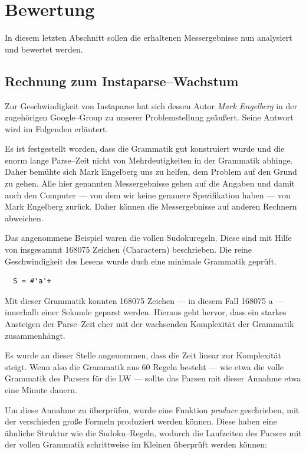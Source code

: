 \documentclass[ngerman,a4paper,abstracton,open=right,twoside=false,toc=listofnumbered,bibtotocnumbered]{scrreprt}
\begin{document}
\chapter{Bewertung}

In diesem letzten Abschnitt sollen die erhaltenen Messergebnisse nun analysiert und bewertet werden.


\section{Rechnung zum Instaparse--Wachstum}

Zur Geschwindigkeit von Instaparse hat sich dessen Autor \emph{Mark Engelberg} in der zugehörigen Google--Group zu unserer Problemstellung geäußert. Seine Antwort wird im Folgenden erläutert. \cite{instaparse-google-group}

Es ist festgestellt worden, dass die Grammatik gut konstruiert wurde und die enorm lange Parse--Zeit nicht von Mehrdeutigkeiten in der Grammatik abhinge. Daher bemühte sich Mark Engelberg uns zu helfen, dem Problem auf den Grund zu gehen. Alle hier genannten Messergebnisse gehen auf die Angaben und damit auch den Computer --- von dem wir keine genauere Spezifikation haben --- von Mark Engelberg zurück. Daher können die Messergebnisse auf anderen Rechnern abweichen.

Das angenommene Beispiel waren die vollen Sudokuregeln. Diese sind mit Hilfe von insgesammt 168075 Zeichen (Charactern) beschrieben. Die reine Geschwindigkeit des Lesens wurde duch eine minimale Grammatik geprüft.

\begin{lstlisting}
  S = #'a'+
\end{lstlisting}

Mit dieser Grammatik konnten 168075 Zeichen --- in diesem Fall 168075 \glqq{}a\grqq{} --- innerhalb einer Sekunde geparst werden. Hieraus geht hervor, dass ein starkes Ansteigen der Parse--Zeit eher mit der wachsenden Komplexität der Grammatik zusammenhängt.

Es wurde an dieser Stelle angenommen, dass die Zeit linear zur Komplexität steigt. Wenn also die Grammatik aus 60 Regeln besteht --- wie etwa die volle Grammatik des Parsers für die LW --- sollte das Parsen mit dieser Annahme etwa eine Minute dauern.

Um diese Annahme zu überprüfen, wurde eine Funktion \emph{produce} geschrieben, mit der verschieden große Formeln produziert werden können. Diese haben eine ähnliche Struktur wie die Sudoku--Regeln, wodurch die Laufzeiten des Parsers mit der vollen Grammatik schrittweise im Kleinen überprüft werden können:
\end{document}
